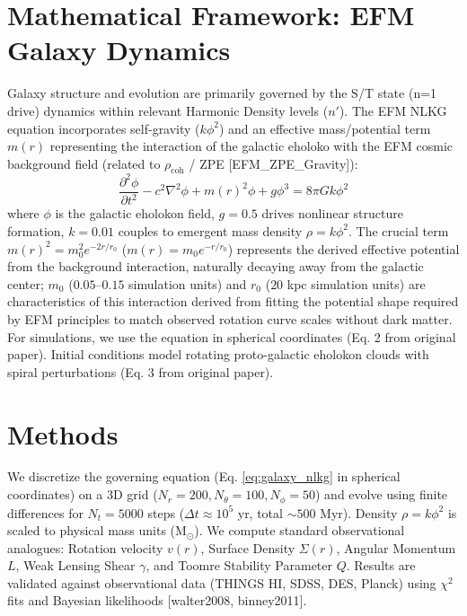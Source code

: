 \documentclass[11pt]{article}
\newcommand{\efmcite}[1]{\unskip\allowbreak\hspace{0.05em plus 0.3em minus 0.05em}[#1]}
\begin{document}
\section{Mathematical Framework: EFM Galaxy Dynamics}
Galaxy structure and evolution are primarily governed by the S/T state (n=1 drive) dynamics within relevant Harmonic Density levels (\(n'\)). The EFM NLKG equation incorporates self-gravity (\(k\phi^2\)) and an effective mass/potential term \(m(r)\) representing the interaction of the galactic eholoko with the EFM cosmic background field (related to \(\rho_{\text{coh}}\) / ZPE \efmcite{EFM_ZPE_Gravity}):
\begin{equation}
\frac{\partial^2 \phi}{\partial t^2} - c^2 \nabla^2 \phi + m(r)^2 \phi + g \phi^3 = 8\pi G k \phi^2
\label{eq:galaxy_nlkg}
\end{equation}
where \(\phi\) is the galactic eholokon field, \(g=0.5\) drives nonlinear structure formation, \(k=0.01\) couples to emergent mass density \(\rho = k \phi^2\). The crucial term \(m(r)^2 = m_0^2 e^{-2r/r_0}\) (\(m(r)=m_0 e^{-r/r_0}\)) represents the derived effective potential from the background interaction, naturally decaying away from the galactic center; \(m_0\) (\(0.05\)–\(0.15\) simulation units) and \(r_0\) (\(20\) kpc simulation units) are characteristics of this interaction derived from fitting the potential shape required by EFM principles to match observed rotation curve scales without dark matter. For simulations, we use the equation in spherical coordinates (Eq. 2 from original paper). Initial conditions model rotating proto-galactic eholokon clouds with spiral perturbations (Eq. 3 from original paper).

\section{Methods}
We discretize the governing equation (Eq. \ref{eq:galaxy_nlkg} in spherical coordinates) on a 3D grid (\(N_r = 200, N_\theta = 100, N_\phi = 50\)) and evolve using finite differences for \(N_t = 5000\) steps (\(\Delta t \approx 10^5\) yr, total \(\sim 500\) Myr). Density \(\rho = k \phi^2\) is scaled to physical mass units (M\(_{\odot}\)). We compute standard observational analogues: Rotation velocity \(v(r)\), Surface Density \(\Sigma(r)\), Angular Momentum \(L\), Weak Lensing Shear \(\gamma\), and Toomre Stability Parameter \(Q\). Results are validated against observational data (THINGS HI, SDSS, DES, Planck) using \(\chi^2\) fits and Bayesian likelihoods \efmcite{walter2008, binney2011}.
\end{document}
